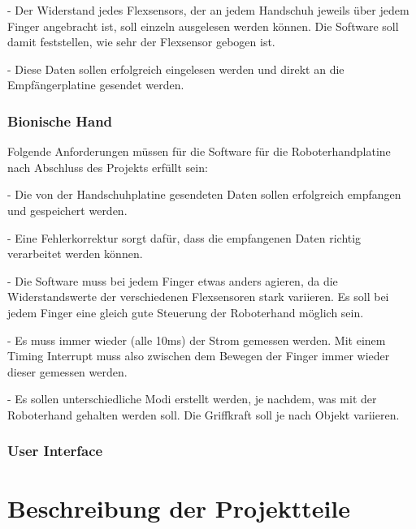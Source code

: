 \documentclass[11pt]{article}
\begin{document}
-	Der Widerstand jedes Flexsensors, der an jedem Handschuh jeweils über jedem Finger angebracht ist, 
soll einzeln ausgelesen werden können. Die Software soll damit feststellen, wie sehr der Flexsensor gebogen ist.

-	Diese Daten sollen erfolgreich eingelesen werden und direkt an die Empfängerplatine gesendet werden.

\subsubsection{Bionische Hand}
Folgende Anforderungen müssen für die Software für die Roboterhandplatine nach Abschluss des Projekts erfüllt sein:

-	Die von der Handschuhplatine gesendeten Daten sollen erfolgreich empfangen und gespeichert werden.

-	Eine Fehlerkorrektur sorgt dafür, dass die empfangenen Daten richtig verarbeitet werden können.

-	Die Software muss bei jedem Finger etwas anders agieren, da die Widerstandswerte der verschiedenen Flexsensoren 
stark variieren. Es soll bei jedem Finger eine gleich gute Steuerung der Roboterhand möglich sein.

-	Es muss immer wieder (alle 10ms) der Strom gemessen werden. Mit einem Timing Interrupt muss also zwischen dem 
Bewegen der Finger immer wieder dieser gemessen werden.

-	Es sollen unterschiedliche Modi erstellt werden, je nachdem, was mit der Roboterhand gehalten werden soll. 
Die Griffkraft soll je nach Objekt variieren.

\subsubsection{User Interface}
\section{Beschreibung der Projektteile}
\end{document}
